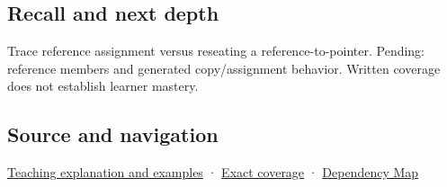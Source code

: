 \subsection{Recall and next depth}\label{appendix-d6d562ca9fbb-recall-and-next-depth}

Trace reference assignment versus reseating a reference-to-pointer. Pending: reference members and generated copy/assignment behavior. Written coverage does not establish learner mastery.

\subsection{Source and navigation}\label{appendix-d6d562ca9fbb-source-and-navigation}

\hyperref[01-foundations-i-ch003-giving-another-name-to-a-live-object]{Teaching explanation and examples} · \hyperref[appendix-fd090d982a15-m008---parts-113-126]{Exact coverage} · \hyperref[appendix-4ad47bdd269a]{Dependency Map}
